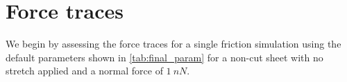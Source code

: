 





\section{Force traces}\label{sec:single_analysis}
We begin by assessing the force traces for a single friction simulation using the default parameters shown in \cref{tab:final_param} for a non-cut sheet with no stretch applied and a normal force of $\SI{1}{nN}$.


